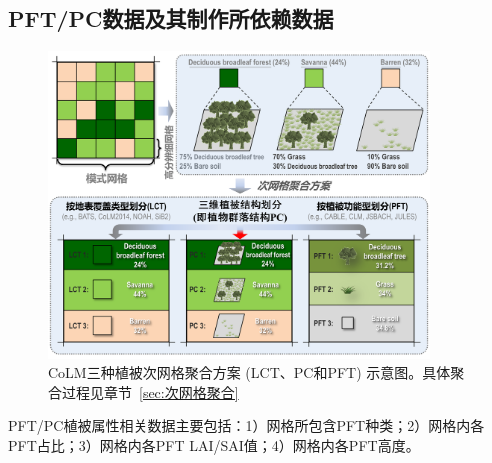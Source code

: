 \subsection{PFT/PC数据及其制作所依赖数据}\label{PFTPC数据及其依赖数据}
{
\begin{figure}[htbp]
\centering
\includegraphics[width=0.9\textwidth]{Figures/基础数据/次网格聚合方案.png}
\caption[CoLM三种植被次网格聚合方案 (LCT、PC和PFT) 示意图]{CoLM三种植被次网格聚合方案 (LCT、PC和PFT) 示意图。具体聚合过程见章节~\ref{sec:次网格聚合}}
\label{fig:次网格聚合方案}
\end{figure}
}

PFT/PC植被属性相关数据主要包括：1）网格所包含PFT种类；2）网格内各PFT占比；3）网格内各PFT LAI/SAI值；4）网格内各PFT高度。

